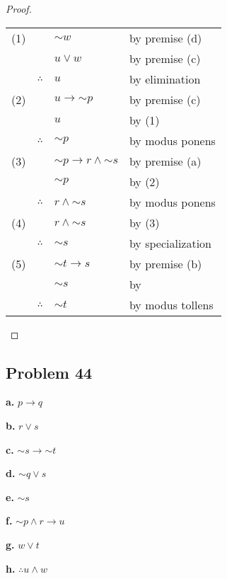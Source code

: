 \documentclass[14pt]{extarticle}
\begin{document}
\begin{proof}
\begin{tabular}{rrll}
(1) & & ${\sim w}$ & by premise (d) \\
 & & $u \vee w$ & by premise (c) \\
 & $\therefore$ & $u$ & by elimination \\
(2) & & $u \to {\sim p}$ & by premise (c)\\
 & & $u$ & by (1) \\
 & $\therefore$ & ${\sim p}$ & by modus ponens \\
(3) & & ${\sim p} \to r \wedge {\sim s}$ & by premise (a) \\
 & & ${\sim p}$ & by (2) \\
 & $\therefore$ & $r \wedge {\sim s}$ & by modus ponens \\
(4) & & $r \wedge {\sim s}$ & by (3) \\
 & $\therefore$ & ${\sim s}$ & by specialization \\
(5) & & ${\sim t} \to s$ & by premise (b) \\
 & & ${\sim s}$ & by \\
 & $\therefore$ & ${\sim t}$ & by modus tollens \\
\end{tabular}
\end{proof}

\subsection{Problem 44}
{\bf a.} $p \to q$

{\bf b.} $r \vee s$

{\bf c.} ${\sim s} \to {\sim t}$

{\bf d.} ${\sim q} \vee s$

{\bf e.} ${\sim s}$

{\bf f.} ${\sim p} \wedge r \to u$

{\bf g.} $w \vee t$

{\bf h.} $\therefore u \wedge w$
\end{document}
